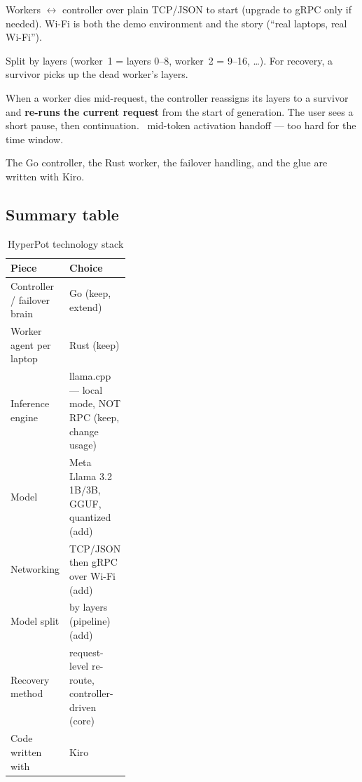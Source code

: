  Workers $\leftrightarrow$
controller over plain TCP/JSON to start (upgrade to gRPC only if needed). Wi-Fi
is both the demo environment and the story (``real laptops, real Wi-Fi'').

 Split by layers (worker~1 =
layers 0--8, worker~2 = 9--16, \ldots). For recovery, a survivor picks up the
dead worker's layers.

When a worker dies mid-request, the controller reassigns its layers to a survivor
and \textbf{re-runs the current request} from the start of generation. The user
sees a short pause, then continuation. \Drop\ mid-token activation handoff --- too
hard for the time window.

 The Go controller, the Rust worker, the
failover handling, and the glue are written with Kiro.

\subsection{Summary table}
\begin{table}[h]
\centering\footnotesize
\caption{HyperPot technology stack}
\label{tab:stack}
\begin{tabularx}{\linewidth}{L{0.34\linewidth}Y}
\toprule
Piece & Choice \\
\midrule
Controller / failover brain & Go (keep, extend) \\
Worker agent per laptop & Rust (keep) \\
Inference engine & llama.cpp --- local mode, NOT RPC (keep, change usage) \\
Model & Meta Llama 3.2 1B/3B, GGUF, quantized (add) \\
Networking & TCP/JSON then gRPC over Wi-Fi (add) \\
Model split & by layers (pipeline) (add) \\
Recovery method & request-level re-route, controller-driven (core) \\
Code written with & Kiro \\
\bottomrule
\end{tabularx}
\end{table}

